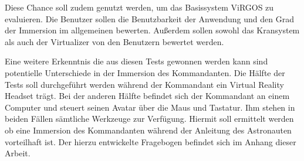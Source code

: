 Diese Chance soll zudem genutzt werden, um das Basissystem ViRGOS zu evaluieren. Die Benutzer sollen die Benutzbarkeit der Anwendung und den Grad der Immersion im allgemeinen bewerten. Außerdem sollen sowohl das Kransystem als auch der Virtualizer von den Benutzern bewertet werden. 

Eine weitere Erkenntnis die aus diesen Tests gewonnen werden kann sind potentielle Unterschiede in der Immersion des Kommandanten. Die Hälfte der Tests soll durchgeführt werden während der Kommandant ein Virtual Reality Headset trägt. Bei der anderen Hälfte befindet sich der Kommandant an einem Computer und steuert seinen Avatar über die Maus und Tastatur. Ihm stehen in beiden Fällen sämtliche Werkzeuge zur Verfügung. Hiermit soll ermittelt werden ob eine Immersion des Kommandanten während der Anleitung des Astronauten vorteilhaft ist. Der hierzu entwickelte Fragebogen befindet sich im Anhang dieser Arbeit.
